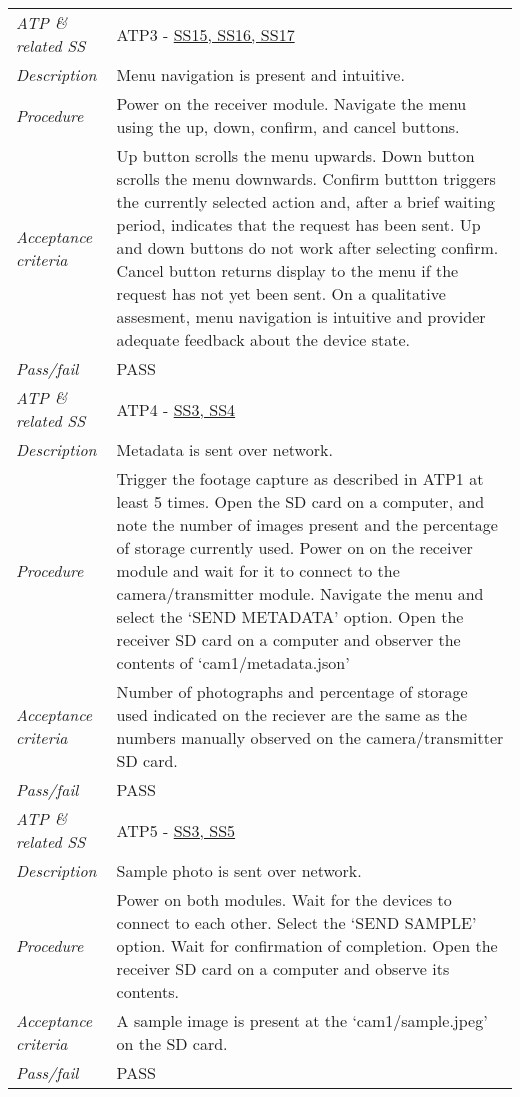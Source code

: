 \documentclass[class=report,11pt,crop=false]{standalone}
\begin{document}
\begin{table}[!ht]
\begin{scriptsize}
\begin{tabularx}{\textwidth}{|p{} X|}
        \textit{ATP \& related SS} &  ATP3 - \hyperlink{tab:firmware-requirements}{SS15, SS16, SS17}\\
        \textit{Description} & Menu navigation is present and intuitive.\\
        \textit{Procedure} & Power on the receiver module. Navigate the menu using the up, down, confirm, and cancel buttons.\\
        \textit{Acceptance criteria} & Up button scrolls the menu upwards. Down button scrolls the menu downwards. Confirm buttton triggers the currently selected action and, after a brief waiting period, indicates that the request has been sent. Up and down buttons do not work after selecting confirm. Cancel button returns display to the menu if the request has not yet been sent. On a qualitative assesment, menu navigation is intuitive and provider adequate feedback about the device state.\\ 
        \textit{Pass/fail} & PASS \\ \hline

        \textit{ATP \& related SS} & ATP4 - \hyperlink{tab:firmware-requirements}{SS3, SS4}\\
        \textit{Description} & Metadata is sent over network.\\
        \textit{Procedure} & Trigger the footage capture as described in ATP1 at least 5 times. Open the SD card on a computer, and note the number of images present and the percentage of storage currently used. Power on on the receiver module and wait for it to connect to the camera/transmitter module. Navigate the menu and select the `SEND METADATA' option. Open the receiver SD card on a computer and observer the contents of `cam1/metadata.json'\\
        \textit{Acceptance criteria} & Number of photographs and percentage of storage used indicated on the reciever are the same as the numbers manually observed on the camera/transmitter SD card. \\ 
        \textit{Pass/fail} & PASS\\ \hline

        \textit{ATP \& related SS} & ATP5 - \hyperlink{tab:firmware-requirements}{SS3, SS5} \\
        \textit{Description} & Sample photo is sent over network.\\
        \textit{Procedure} & Power on both modules. Wait for the devices to connect to each other. Select the `SEND SAMPLE' option. Wait for confirmation of completion. Open the receiver SD card on a computer and observe its contents.\\
        \textit{Acceptance criteria} & A sample image is present at the `cam1/sample.jpeg' on the SD card. \\ 
        \textit{Pass/fail} & PASS \\ \hline


\end{tabularx}
\end{scriptsize}
\end{table}
\end{document}
